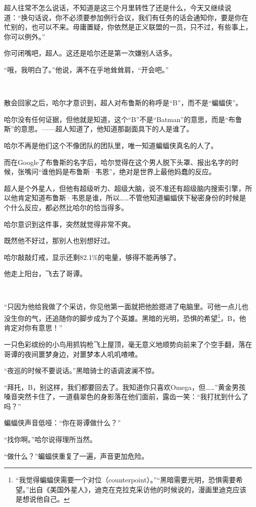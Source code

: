 \documentclass[../main]{subfiles}
\begin{document}
超人往常不怎么说话，不知道是这三个月里转性了还是什么，今天又继续说道：“换句话说，你不必须要参加例行会议，我们有任务的话会通知你，要是你在忙别的，也可以不来。毋庸置疑，你依然是正义联盟的一员，只不过，有些事上，你可以例外。”

你可闭嘴吧，超人。这还是哈尔还是第一次嫌别人话多。

“哦，我明白了。”他说，满不在乎地耸耸肩，“开会吧。”

~\

散会回家之后，哈尔才意识到，超人对布鲁斯的称呼是“B”，而不是“蝙蝠侠”。

哈尔没有任何证据，但他就是知道，这个“B”不是“Batman”的意思，而是“布鲁斯”的意思。——超人知道了，他知道那副面具下的人是谁了。

哈尔不再是他们这个不像团队的团队里，唯一知道蝙蝠侠真名的人了。

而在Google了布鲁斯的名字后，哈尔觉得在这个男人脱下头罩、报出名字的时候，张嘴问“谁他妈是布鲁斯·韦恩”，绝对是世界上最他妈蠢的反应。

超人是个外星人，但他有超级听力、超级大脑，说不准还有超级脑内搜索引擎，所以他肯定知道布鲁斯·韦恩是谁，所以……不管他知道蝙蝠侠下秘密身份的时候是个什么反应，都必然比哈尔的恰当得多。

哈尔意识到这件事，突然就觉得非常不爽。

既然他不好过，那别人也别想好过。

哈尔敲敲灯戒，显示还剩82.1\%的电量，够得不能再够了。

他走上阳台，飞去了哥谭。

~\

“只因为他给我做了个采访，你见他第一面就把他脸摁进了电脑里。可他一点儿也没生你的气，还追随你的脚步成为了个英雄。黑暗的光明，恐惧的希望\footnote[1]{“我觉得蝙蝠侠需要一个对位（counterpoint）。”“黑暗需要光明，恐惧需要希望。”出自《美国外星人》，迪克在克拉克采访他的时候说的，漫画里迪克应该是想说他自己。}，B，他肯定对你有意思！”

一只色彩缤纷的小鸟用抓钩枪飞上屋顶，毫无意义地顺势向前来了个空手翻，落在哥谭的夜间噩梦身边，对噩梦本人叽叽喳喳。

“夜巡的时候不要说话。”黑暗骑士的语调波澜不惊。

“拜托，B，别这样，我们都要回去了。我知道你只喜欢Omega，但……”黄金男孩嗓音突然卡住了，一道翡翠色的身影落在他们面前，露齿一笑：“我打扰到什么了吗？”

蝙蝠侠声音低哑：“你在哥谭做什么？”

“找你啊。”哈尔说得理所当然。

“做什么？”蝙蝠侠重复了一遍，声音更加危险。
\end{document}

